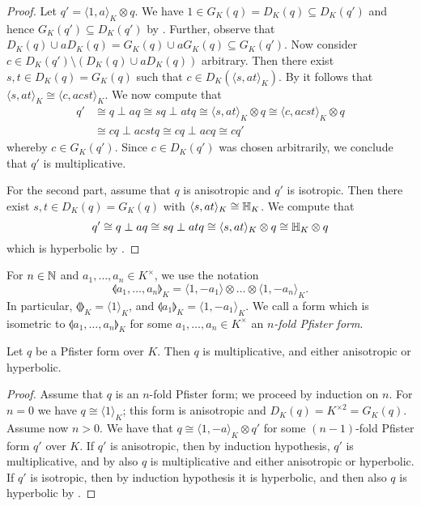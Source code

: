 \documentclass[12pt, leqno, british]{amsart}
\begin{document}
\begin{proof}
Let $q' = \langle 1, a \rangle_K \otimes q$. We have $1 \in G_K(q) = D_K(q) \subseteq D_K(q')$ and hence $G_K(q') \subseteq D_K(q')$ by .
Further, observe that $D_K(q) \cup aD_K(q) = G_K(q) \cup aG_K(q) \subseteq G_K(q')$. 
Now consider $c \in D_K(q') \setminus (D_K(q) \cup aD_K(q))$ arbitrary.
Then there exist $s, t \in D_K(q) = G_K(q)$ such that $c \in D_K(\langle s, at \rangle_K)$.
By  it follows that $\langle s, at \rangle_K \cong \langle c, acst \rangle_K$.
We now compute that
\begin{align*}
q' &\cong q \perp a q \cong sq \perp atq \cong \langle s, at \rangle_K \otimes q \cong \langle c, acst \rangle_K \otimes q \\
&\cong cq \perp acstq \cong cq \perp acq \cong cq'
\end{align*}
whereby $c \in G_K(q')$.
Since $c \in D_K(q')$ was chosen arbitrarily, we conclude that $q'$ is multiplicative.

For the second part, assume that $q$ is anisotropic and $q'$ is isotropic.
Then there exist $s, t \in D_K(q) = G_K(q)$ with $\langle s, at \rangle_K \cong \mathbb{H}_K$.
We compute that
$$ q' \cong q \perp aq \cong sq \perp atq \cong \langle s, at \rangle_K \otimes q \cong \mathbb{H}_K \otimes q $$
which is hyperbolic by .
\end{proof}
\begin{defi}
For $n \in \mathbb N$ and $a_1, \ldots, a_n \in K^\times$, we use the notation
$$ \llangle a_1, \ldots, a_n \rrangle_K = \langle 1, -a_1 \rangle \otimes \ldots \otimes \langle 1, -a_n \rangle_K. $$
In particular, $\llangle \rrangle_K = \langle 1 \rangle_K$, and $\llangle a_1 \rrangle_K = \langle 1, -a_1 \rangle_K$.
We call a form which is isometric to $\llangle a_1, \ldots, a_n \rrangle_K$ for some $a_1, \ldots, a_n \in K^\times$ an \emph{$n$-fold Pfister form}.
\end{defi}
\begin{thm}[Pfister]\label{T:Pfister-forms}
Let $q$ be a Pfister form over $K$.
Then $q$ is multiplicative, and either anisotropic or hyperbolic.
\end{thm}
\begin{proof}
Assume that $q$ is an $n$-fold Pfister form; we proceed by induction on $n$.
For $n = 0$ we have $q \cong \langle 1 \rangle_K$; this form is anisotropic and $D_K(q) = K^{\times 2} = G_K(q)$.
Assume now $n > 0$.
We have that $q \cong \langle 1, -a \rangle_K \otimes q'$ for some $(n-1)$-fold Pfister form $q'$ over $K$.
If $q'$ is anisotropic, then by induction hypothesis, $q'$ is multiplicative, and by  also $q$ is multiplicative and either anisotropic or hyperbolic.
If $q'$ is isotropic, then by induction hypothesis it is hyperbolic, and then also $q$ is hyperbolic by .
\end{proof}
\end{document}
